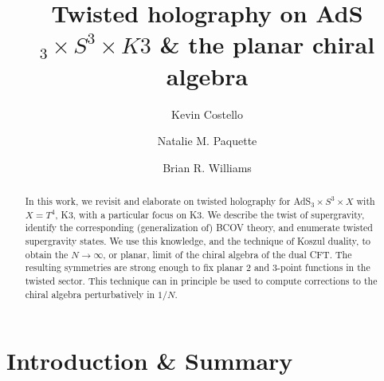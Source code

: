 \documentclass[11pt]{amsart}
\title{Twisted holography on AdS$_3 \times S^3 \times K3$ \& the planar chiral algebra}
\author{Kevin Costello}
\author{Natalie M. Paquette}
\author{Brian R. Williams}
\begin{document}
\maketitle

\begin{abstract} %
In this work, we revisit and elaborate on twisted holography for AdS$_3 \times S^3 \times X$ with $X= T^4$, K3, with a particular focus on K3. We describe the twist of supergravity, identify the corresponding (generalization of) BCOV theory, and enumerate twisted supergravity states. We use this knowledge, and the technique of Koszul duality, to obtain the $N \rightarrow \infty$, or planar, limit of the chiral algebra of the dual CFT. The resulting symmetries are strong enough to fix planar 2 and 3-point functions in the twisted sector. This technique can in principle be used to compute corrections to the chiral algebra perturbatively in $1/N$.
\end{abstract}

\tableofcontents

\section{Introduction \& Summary}
\end{document}
